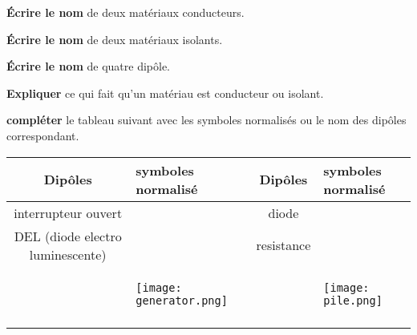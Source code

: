 \documentclass[11pt]{exam}		%
\begin{document}
\begin{questions}
	\question[2] 
	\textbf{Écrire le nom} de deux matériaux conducteurs.
	
	\question[2] 
	\textbf{Écrire le nom} de deux matériaux isolants.
	
	\question[2] 
	\textbf{Écrire le nom} de quatre dipôle.
	
	\question[2] 
	\textbf{Expliquer} ce qui fait qu'un matériau est conducteur ou isolant.
	
	\question[4] 
	\textbf{compléter} le tableau suivant avec les symboles normalisés 
	ou le nom des dipôles correspondant.
    \vspace{20pt}
	\begin{center}
	\begin{tabular}{|c|p{4cm}|||||c|p{4cm}|}
		\hline
		Dipôles & symboles normalisé & Dipôles & symboles normalisé \\
		\hline
		interrupteur ouvert & \vspace{25pt} & diode  & \\
		\hline
		DEL (diode electro luminescente) & \vspace{25pt} & resistance  & \\
		\hline
		& \hspace*{-1cm}\begin{minipage}{.3\textwidth}
			\begin{center}
				\vspace{0.5cm}
				\texttt{[image: generator.png]}
			\end{center}
		  \end{minipage} 
		& %
		& \hspace*{-1cm}\begin{minipage}{.3\textwidth}
			\begin{center}
				\vspace{0.5cm}
				\texttt{[image: pile.png]}
			\end{center}
		  \end{minipage}
		\\
		& 
		&  
		&  \\ \hline

\end{tabular}
\end{center}
\end{questions}
\end{document}
